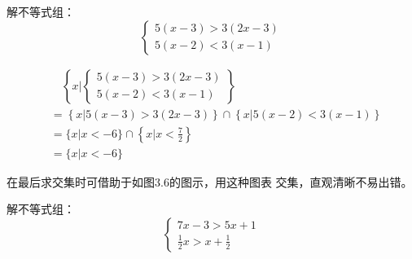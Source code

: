 \begin{example}
    解不等式组：
    \[\begin{cases}
        5(x-3)>3(2x-3)\\
        5(x-2)<3(x-1)
    \end{cases}\]
\end{example}

\begin{solution}
\[\begin{split}
&\quad \left\{x\Big|\begin{cases}
    5(x-3)>3(2x-3)\\
    5(x-2)<3(x-1)
\end{cases} \right\}\\
&=\left\{x\Big|5(x-3)>3(2x-3) \right\} \cap \left\{x\Big|5(x-2)<3(x-1) \right\}    \\
&=\{x|x<-6\}\cap\left\{x\Big|x<\frac{7}{2}\right\}\\
&=\{x|x<-6\}
\end{split}\] 

\begin{figure}[htp]
    \centering
{}
    \caption{}
\end{figure}


在最后求交集时可借助于如图3.6的图示，用这种图表
交集，直观清晰不易出错。
\end{solution}

\begin{example}
    解不等式组：
\[\begin{cases}
    7x-3>5x+1\\
    \frac{1}{2}x>x+\frac{1}{2}
\end{cases}\]
\end{example}

